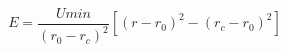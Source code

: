 \documentclass[12pt]{article}
\begin{document}
$$
   E = \frac{Umin}{(r_0-r_c)^2} \left[ (r-r_0)^2-(r_c-r_0)^2 \right] 
$$
\end{document}
